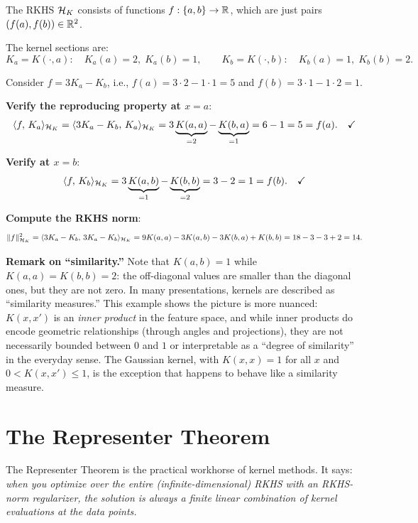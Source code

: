 \begin{notechapter}
\begin{examplebox}
The RKHS $\mathcal{H}_K$ consists of functions $f: \{a,b\} \to \mathbb{R}$, which are just
pairs $(f(a), f(b)) \in \mathbb{R}^2$.

The kernel sections are:
\[
K_a = K(\cdot, a): \quad K_a(a) = 2,\; K_a(b) = 1, \qquad K_b = K(\cdot,
b): \quad K_b(a) = 1,\; K_b(b) = 2.
\]

Consider $f = 3K_a - K_b$, i.e., $f(a) = 3 \cdot 2 - 1 \cdot 1 = 5$ and
$f(b) = 3 \cdot 1 - 1 \cdot 2 = 1$.

\textbf{Verify the reproducing property at $x = a$}:
\[
\langle f,\, K_a \rangle_{\mathcal{H}_K} = \langle 3K_a - K_b,\, K_a \rangle_{\mathcal{H}_K} =
3\underbrace{K(a,a)}_{=2} - \underbrace{K(b,a)}_{=1} = 6 - 1 = 5 = f(a).
\quad\checkmark
\]

\textbf{Verify at $x = b$}:
\[
\langle f,\, K_b \rangle_{\mathcal{H}_K} = 3\underbrace{K(a,b)}_{=1} -
\underbrace{K(b,b)}_{=2} = 3 - 2 = 1 = f(b). \quad\checkmark
\]

\textbf{Compute the RKHS norm}:
\[
\| f \|_{\mathcal{H}_K}^2 = \langle 3K_a - K_b,\, 3K_a - K_b \rangle_{\mathcal{H}_K} = 9K(a,a) -
3K(a,b) - 3K(b,a) + K(b,b) = 18 - 3 - 3 + 2 = 14.
\]

\textbf{Remark on ``similarity.''}
Note that $K(a,b) = 1$ while $K(a,a) = K(b,b) = 2$:
the off-diagonal values are smaller than the diagonal
ones, but they are not zero. In many presentations,
kernels are described as ``similarity measures.''
This example shows the picture is more nuanced:
$K(x,x')$ is an \emph{inner product} in the feature
space, and while inner products do encode geometric
relationships (through angles and projections), they
are not necessarily bounded between $0$ and $1$ or
interpretable as a ``degree of similarity'' in the
everyday sense. The Gaussian kernel, with
$K(x,x) = 1$ for all $x$ and
$0 < K(x,x') \leq 1$, is the exception that
happens to behave like a similarity measure.
\end{examplebox}


\section{The Representer Theorem}
\label{rkhs:sec:representer}

The Representer Theorem is the practical workhorse of kernel methods. It
says: \emph{when you optimize over the entire (infinite-dimensional)
RKHS with an RKHS-norm regularizer, the solution is always a finite
linear combination of kernel evaluations at the data points.}


\end{notechapter}
